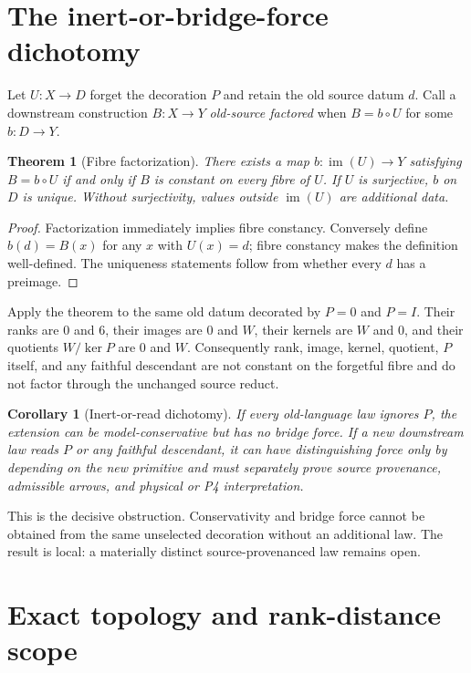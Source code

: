 \documentclass[11pt]{article}
\newtheorem{theorem}{Theorem}
\newtheorem{corollary}{Corollary}
\newcommand{\im}{\operatorname{im}}
\begin{document}
\section{The inert-or-bridge-force dichotomy}

Let $U:X\to D$ forget the decoration $P$ and retain the old source datum $d$.
Call a downstream construction $B:X\to Y$ \emph{old-source factored} when
$B=b\circ U$ for some $b:D\to Y$.

\begin{theorem}[Fibre factorization]
There exists a map $b:\im(U)\to Y$ satisfying $B=b\circ U$ if and only if $B$
is constant on every fibre of $U$.  If $U$ is surjective, $b$ on $D$ is
unique.  Without surjectivity, values outside $\im(U)$ are additional data.
\end{theorem}

\begin{proof}
Factorization immediately implies fibre constancy.  Conversely define
$b(d)=B(x)$ for any $x$ with $U(x)=d$; fibre constancy makes the definition
well-defined.  The uniqueness statements follow from whether every $d$ has a
preimage.
\end{proof}

Apply the theorem to the same old datum decorated by $P=0$ and $P=I$.  Their
ranks are $0$ and $6$, their images are $0$ and $W$, their kernels are $W$ and
$0$, and their quotients $W/\ker P$ are $0$ and $W$.  Consequently rank,
image, kernel, quotient, $P$ itself, and any faithful descendant are not
constant on the forgetful fibre and do not factor through the unchanged
source reduct.

\begin{corollary}[Inert-or-read dichotomy]
If every old-language law ignores $P$, the extension can be model-conservative
but has no bridge force.  If a new downstream law reads $P$ or any faithful
descendant, it can have distinguishing force only by depending on the new
primitive and must separately prove source provenance, admissible arrows, and
physical or P4 interpretation.
\end{corollary}

This is the decisive obstruction.  Conservativity and bridge force cannot be
obtained from the same unselected decoration without an additional law.  The
result is local: a materially distinct source-provenanced law remains open.

\section{Exact topology and rank-distance scope}
\end{document}
